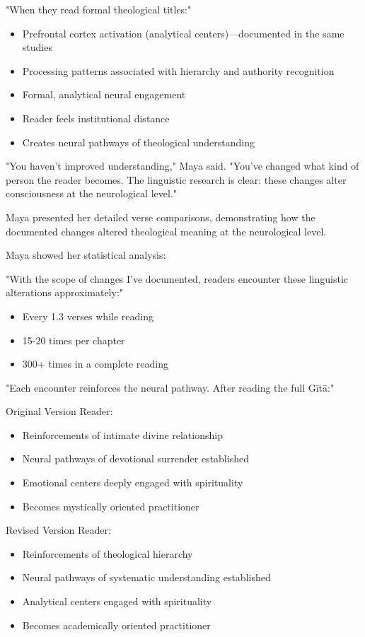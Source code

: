 \documentclass[12pt,twoside]{book}
\begin{document}
"When they read formal theological titles:"
\begin{itemize}
\item Prefrontal cortex activation (analytical centers)—documented in the same studies
\item Processing patterns associated with hierarchy and authority recognition
\item Formal, analytical neural engagement
\item Reader feels institutional distance
\item Creates neural pathways of theological understanding
\end{itemize}

"You haven't improved understanding," Maya said. "You've changed what kind of person the reader becomes. The linguistic research is clear: these changes alter consciousness at the neurological level."

Maya presented her detailed verse comparisons, demonstrating how the documented changes altered theological meaning at the neurological level.

Maya showed her statistical analysis:

"With the scope of changes I've documented, readers encounter these linguistic alterations approximately:"
\begin{itemize}
\item Every 1.3 verses while reading
\item 15-20 times per chapter
\item 300+ times in a complete reading
\end{itemize}

"Each encounter reinforces the neural pathway. After reading the full Gītā:"

Original Version Reader:
\begin{itemize}
\item Reinforcements of intimate divine relationship
\item Neural pathways of devotional surrender established
\item Emotional centers deeply engaged with spirituality
\item Becomes mystically oriented practitioner
\end{itemize}

Revised Version Reader:
\begin{itemize}
\item Reinforcements of theological hierarchy
\item Neural pathways of systematic understanding established
\item Analytical centers engaged with spirituality
\item Becomes academically oriented practitioner
\end{itemize}
\end{document}
